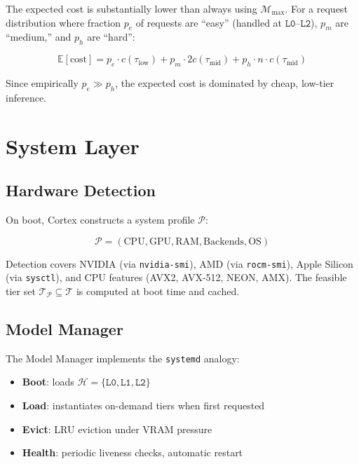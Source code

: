 \documentclass[11pt, a4paper, twocolumn]{article}
\newcommand{\tier}[1]{\texttt{L#1}}
\newcommand{\model}{\mathcal{M}}
\begin{document}
The expected cost is substantially lower than always using $\model_{\max}$. For a request distribution where fraction $p_e$ of requests are ``easy'' (handled at $\tier{0}$--$\tier{2}$), $p_m$ are ``medium,'' and $p_h$ are ``hard'':

\begin{equation}
    \mathbb{E}[\text{cost}] = p_e \cdot c(\tau_{\text{low}}) + p_m \cdot 2c(\tau_{\text{mid}}) + p_h \cdot n \cdot c(\tau_{\text{mid}})
\end{equation}

Since empirically $p_e \gg p_h$, the expected cost is dominated by cheap, low-tier inference.

\section{System Layer}

\subsection{Hardware Detection}

On boot, Cortex constructs a system profile $\mathcal{P}$:

\begin{equation}
    \mathcal{P} = (\text{CPU}, \text{GPU}, \text{RAM}, \text{Backends}, \text{OS})
\end{equation}

Detection covers NVIDIA (via \texttt{nvidia-smi}), AMD (via \texttt{rocm-smi}), Apple Silicon (via \texttt{sysctl}), and CPU features (AVX2, AVX-512, NEON, AMX). The feasible tier set $\mathcal{T}_\mathcal{P} \subseteq \mathcal{T}$ is computed at boot time and cached.

\subsection{Model Manager}

The Model Manager implements the \texttt{systemd} analogy:

\begin{itemize}[nosep, leftmargin=*]
    \item \textbf{Boot}: loads $\mathcal{H} = \{\tier{0}, \tier{1}, \tier{2}\}$
    \item \textbf{Load}: instantiates on-demand tiers when first requested
    \item \textbf{Evict}: LRU eviction under VRAM pressure
    \item \textbf{Health}: periodic liveness checks, automatic restart
\end{itemize}
\end{document}
